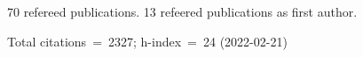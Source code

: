70 refereed publications. 13 refeered publications as first author.

Total citations~=~2327; h-index~=~24 (2022-02-21)